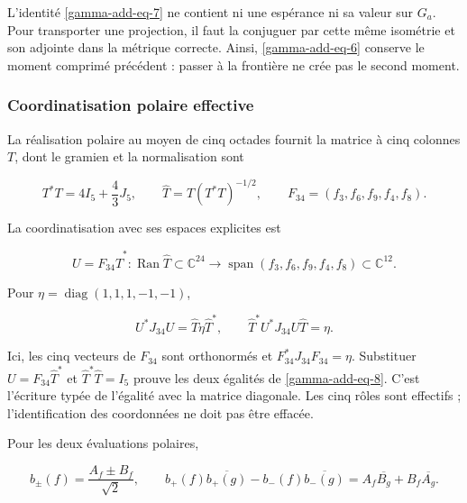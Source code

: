 L'identité \eqref{gamma-add-eq-7} ne contient ni une espérance ni sa valeur sur \(G_a\). Pour transporter une projection, il faut la conjuguer par cette même isométrie et son adjointe dans la métrique correcte. Ainsi, \eqref{gamma-add-eq-6} conserve le moment comprimé précédent : passer à la frontière ne crée pas le second moment.

\subsubsection{Coordinatisation polaire effective}
\label{gamma-add-sub-220}

La réalisation polaire au moyen de cinq octades fournit la matrice à cinq
colonnes \(T\), dont le gramien et la normalisation sont

\begin{equation}
T^*T=4I_5+\frac43J_5,\qquad
\widehat T=T(T^*T)^{-1/2},\qquad
F_{34}=(f_3,f_6,f_9,f_4,f_8).
\label{gamma-add-display-18}
\end{equation}

La coordinatisation avec ses espaces explicites est

\begin{equation}
U=F_{34}\widehat T^*:
\operatorname{Ran}\widehat T\subset\mathbb C^{24}
\longrightarrow\operatorname{span}(f_3,f_6,f_9,f_4,f_8)\subset\mathbb C^{12}.
\label{gamma-add-display-19}
\end{equation}

Pour \(\eta=\operatorname{diag}(1,1,1,-1,-1)\),

\begin{equation}
U^*J_{34}U=\widehat T\eta\widehat T^*,\qquad
\widehat T^*U^*J_{34}U\widehat T=\eta.
\label{gamma-add-eq-8}
\end{equation}

Ici, les cinq vecteurs de \(F_{34}\) sont orthonormés et \(F_{34}^*J_{34}F_{34}=\eta\). Substituer \(U=F_{34}\widehat T^*\) et \(\widehat T^*\widehat T=I_5\) prouve les deux égalités de \eqref{gamma-add-eq-8}. C'est l'écriture typée de l'égalité avec la matrice diagonale. Les cinq rôles sont effectifs ; l'identification des coordonnées ne doit pas être effacée.

Pour les deux évaluations polaires,

\begin{equation}
b_\pm(f)=\frac{A_f\pm B_f}{\sqrt2},\qquad
b_+(f)\overline{b_+(g)}-b_-(f)\overline{b_-(g)}
=A_f\overline{B_g}+B_f\overline{A_g}.
\label{gamma-add-eq-9}
\end{equation}

